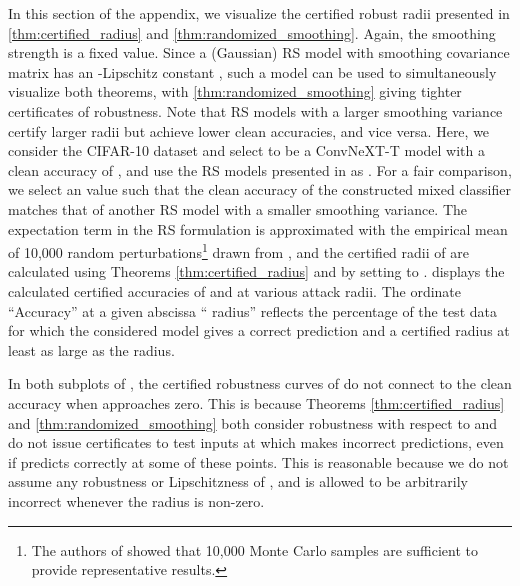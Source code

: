 \documentclass[11pt, letterpaper]{article}
\theoremstyle{plain}
\theoremstyle{definition}
\begin{document}
In this section of the appendix, we visualize the certified robust radii presented in \cref{thm:certified_radius} and \cref{thm:randomized_smoothing}. Again, the smoothing strength  is a fixed value. Since a (Gaussian) RS model with smoothing covariance matrix  has an -Lipschitz constant , such a model can be used to simultaneously visualize both theorems, with \cref{thm:randomized_smoothing} giving tighter certificates of robustness. Note that RS models with a larger smoothing variance certify larger radii but achieve lower clean accuracies, and vice versa. Here, we consider the CIFAR-10 dataset and select  to be a ConvNeXT-T model with a clean accuracy of , and use the RS models presented in \citep{Zhang19} as . For a fair comparison, we select an  value such that the clean accuracy of the constructed mixed classifier  matches that of another RS model  with a smaller smoothing variance. The expectation term in the RS formulation is approximated with the empirical mean of 10,000 random perturbations\footnote{The authors of \citep{Cohen19} showed that 10,000 Monte Carlo samples are sufficient to provide representative results.} drawn from , and the certified radii of  are calculated using Theorems \ref{thm:certified_radius} and  by setting  to .  displays the calculated certified accuracies of  and  at various attack radii. The ordinate ``Accuracy'' at a given abscissa `` radius'' reflects the percentage of the test data for which the considered model gives a correct prediction and a certified radius at least as large as the  radius.

In both subplots of , the certified robustness curves of  do not connect to the clean accuracy when  approaches zero. This is because Theorems \ref{thm:certified_radius} and \ref{thm:randomized_smoothing} both consider robustness with respect to  and do not issue certificates to test inputs at which  makes incorrect predictions, even if  predicts correctly at some of these points. This is reasonable because we do not assume any robustness or Lipschitzness of , and  is allowed to be arbitrarily incorrect whenever the radius is non-zero.
\end{document}
